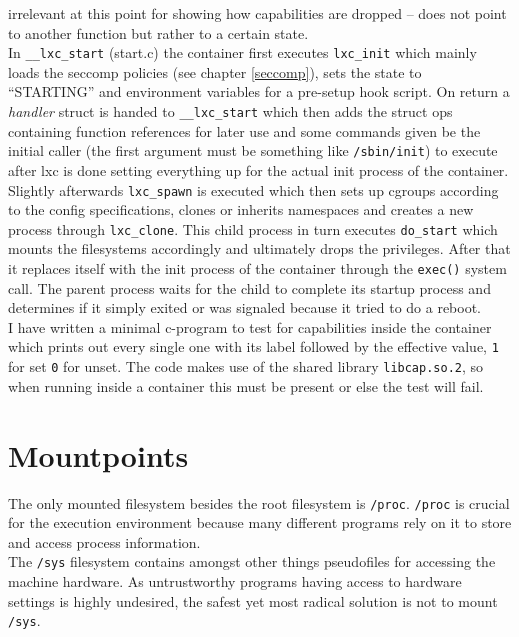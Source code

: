 irrelevant at this point for showing how capabilities are dropped -- does not point to another function but rather to a certain state.\\
In \texttt{\_\_lxc\_start} (start.c) the container first executes \texttt{lxc\_init} which mainly loads the seccomp policies (see chapter \ref{seccomp}),
sets the state to ``STARTING'' and environment variables for a pre-setup hook script. On return a \textit{handler} struct is handed to
\texttt{\_\_lxc\_start} which then adds the struct ops containing function references for later use and some commands given be the
initial caller (the first argument must be something like \texttt{/sbin/init}) to execute after lxc is done setting everything up for
the actual init process of the container.
Slightly afterwards \texttt{lxc\_spawn} is executed which then sets up cgroups according to the config specifications,
clones or inherits namespaces and creates a new process through \texttt{lxc\_clone}. This child process in turn executes \texttt{do\_start} which
mounts the filesystems accordingly and ultimately drops the privileges. After that it replaces itself with the init process of
the container through the \texttt{exec()} system call. The parent process waits for the child to complete its startup process and determines
if it simply exited or was signaled because it tried to do a reboot.\\
I have written a minimal c-program to test for capabilities inside the container which prints out every single one with
its label followed by the effective value, \texttt{1} for set \texttt{0} for unset. The code makes use of the shared library
\texttt{libcap.so.2}, so when running inside a container this must be present or else the test will fail.

\section{Mountpoints}

The only mounted filesystem besides the root filesystem is \texttt{/proc}. \texttt{/proc} is crucial for the execution environment because many
different programs rely on it to store and access process information.\\
The \texttt{/sys} filesystem contains amongst other things pseudofiles for accessing the machine hardware. As untrustworthy programs
having access to hardware settings is highly undesired, the safest yet most radical solution is not to mount \texttt{/sys}.